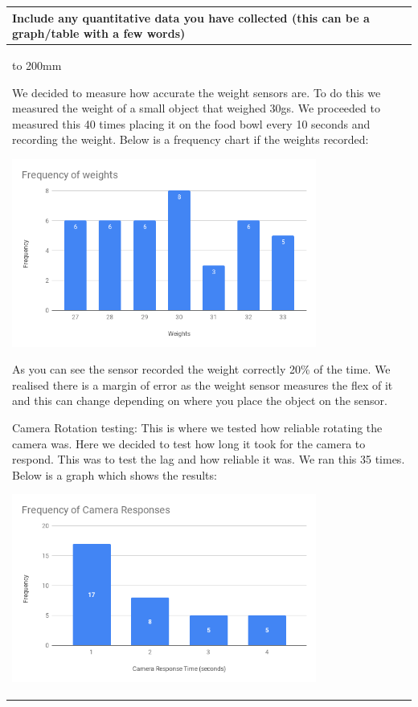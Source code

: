 \documentclass[a4paper]{article}
\newcommand{\colWidth}{141mm}
\begin{document}
\begin{center}
\begin{tabular}{|p{\colWidth}|}
	\hline
	\cellcolor{blue!25}\large
	\textbf{Include any quantitative data you have collected (this can be a graph/table with a few words)}
	\\ \hline
	\vtop to 200mm{

We decided to measure how accurate the weight sensors are. To do this we measured the weight of a small object that weighed 30gs. We proceeded to measured this 40 times placing it on the food bowl every 10 seconds and recording the weight. Below is a frequency chart if the weights recorded:
\vspace{5mm}

 \includegraphics[width=10cm]{weights.png}
 
 \vspace{5mm}
 As you can see the sensor recorded the weight correctly 20\% of the time. We realised there is a margin of error as the weight sensor measures the flex of it and this can change depending on where you place the object on the sensor.
 
 
 \vspace{5mm}
 
 
Camera Rotation testing: This is where we tested how reliable rotating the camera was. Here we decided to test how long it took for the camera to respond. This was to test the lag and how reliable it was. We ran this 35 times. Below is a graph which shows the results:

 \includegraphics[width=10cm]{camera.png}
 
}
\end{tabular}
\end{center}
\end{document}
